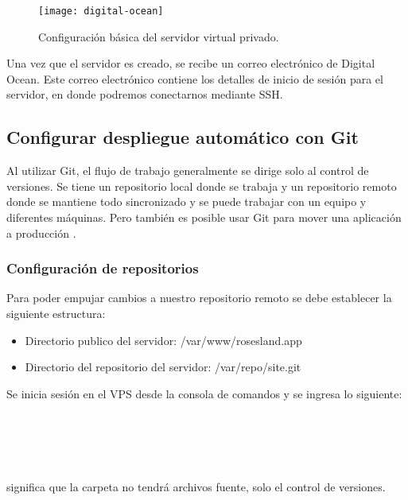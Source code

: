 \begin{figure}[H]
  \centering
  \texttt{[image: digital-ocean]}
  \caption{Configuración básica del servidor virtual privado.}
  \label{digital-ocean}
\end{figure}

Una vez que el servidor es creado, se recibe un correo electrónico de Digital Ocean. Este correo electrónico contiene los detalles de inicio de sesión para el servidor, en donde podremos conectarnos mediante SSH.
\vspace{0.8cm}

\subsection{Configurar despliegue automático con Git}
Al utilizar Git, el flujo de trabajo generalmente se dirige solo al control de versiones. Se tiene un repositorio local donde se trabaja y un repositorio remoto donde se mantiene todo sincronizado y se puede trabajar con un equipo y diferentes máquinas. Pero también es posible usar Git para mover una aplicación a producción \cite{vaccaro}.
\vspace{0.8cm}

\subsubsection{Configuración de repositorios}
Para poder empujar cambios a nuestro repositorio remoto se debe establecer la siguiente estructura:

\begin{itemize}
  \item Directorio publico del servidor: /var/www/rosesland.app
  \item Directorio del repositorio del servidor: /var/repo/site.git
\end{itemize}

Se inicia sesión en el VPS desde la consola de comandos y se ingresa lo siguiente:\\
\\
\\
\\
\\
\\

 significa que la carpeta no tendrá archivos fuente, solo el control de versiones.

